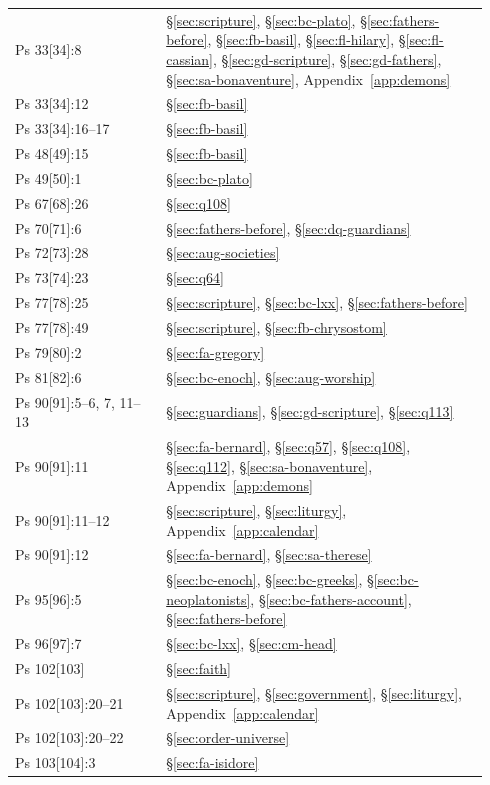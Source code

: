 \begin{longtable}{>{\raggedright\arraybackslash}p{0.30\linewidth}>{\raggedright\arraybackslash}p{0.64\linewidth}}
Ps 33[34]:8 & \S\ref{sec:scripture}, \S\ref{sec:bc-plato}, \S\ref{sec:fathers-before}, \S\ref{sec:fb-basil}, \S\ref{sec:fl-hilary}, \S\ref{sec:fl-cassian}, \S\ref{sec:gd-scripture}, \S\ref{sec:gd-fathers}, \S\ref{sec:sa-bonaventure}, Appendix~\ref{app:demons}\\
Ps 33[34]:12 & \S\ref{sec:fb-basil}\\
Ps 33[34]:16--17 & \S\ref{sec:fb-basil}\\
Ps 48[49]:15 & \S\ref{sec:fb-basil}\\
Ps 49[50]:1 & \S\ref{sec:bc-plato}\\
Ps 67[68]:26 & \S\ref{sec:q108}\\
Ps 70[71]:6 & \S\ref{sec:fathers-before}, \S\ref{sec:dq-guardians}\\
Ps 72[73]:28 & \S\ref{sec:aug-societies}\\
Ps 73[74]:23 & \S\ref{sec:q64}\\
Ps 77[78]:25 & \S\ref{sec:scripture}, \S\ref{sec:bc-lxx}, \S\ref{sec:fathers-before}\\
Ps 77[78]:49 & \S\ref{sec:scripture}, \S\ref{sec:fb-chrysostom}\\
Ps 79[80]:2 & \S\ref{sec:fa-gregory}\\
Ps 81[82]:6 & \S\ref{sec:bc-enoch}, \S\ref{sec:aug-worship}\\
Ps 90[91]:5--6, 7, 11--13 & \S\ref{sec:guardians}, \S\ref{sec:gd-scripture}, \S\ref{sec:q113}\\
Ps 90[91]:11 & \S\ref{sec:fa-bernard}, \S\ref{sec:q57}, \S\ref{sec:q108}, \S\ref{sec:q112}, \S\ref{sec:sa-bonaventure}, Appendix~\ref{app:demons}\\
Ps 90[91]:11--12 & \S\ref{sec:scripture}, \S\ref{sec:liturgy}, Appendix~\ref{app:calendar}\\
Ps 90[91]:12 & \S\ref{sec:fa-bernard}, \S\ref{sec:sa-therese}\\
Ps 95[96]:5 & \S\ref{sec:bc-enoch}, \S\ref{sec:bc-greeks}, \S\ref{sec:bc-neoplatonists}, \S\ref{sec:bc-fathers-account}, \S\ref{sec:fathers-before}\\
Ps 96[97]:7 & \S\ref{sec:bc-lxx}, \S\ref{sec:cm-head}\\
Ps 102[103] & \S\ref{sec:faith}\\
Ps 102[103]:20--21 & \S\ref{sec:scripture}, \S\ref{sec:government}, \S\ref{sec:liturgy}, Appendix~\ref{app:calendar}\\
Ps 102[103]:20--22 & \S\ref{sec:order-universe}\\
Ps 103[104]:3 & \S\ref{sec:fa-isidore}\\

\end{longtable}
